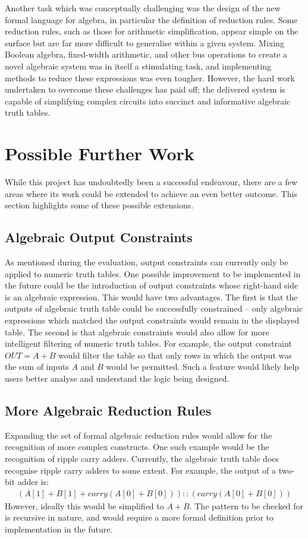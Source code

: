 Another task which was conceptually challenging was the design of the new formal language for algebra, in particular the definition of reduction rules. Some reduction rules, such as those for arithmetic simplification, appear simple on the surface but are far more difficult to generalise within a given system. Mixing Boolean algebra, fixed-width arithmetic, and other bus operations to create a novel algebraic system was in itself a stimulating task, and implementing methods to reduce these expressions was even tougher. However, the hard work undertaken to overcome these challenges has paid off; the delivered system is capable of simplifying complex circuits into succinct and informative algebraic truth tables.

\section{Possible Further Work}
While this project has undoubtedly been a successful endeavour, there are a few areas where its work could be extended to achieve an even better outcome. This section highlights some of these possible extensions.
\subsection{Algebraic Output Constraints} \label{subsec:algoutputcons}
As mentioned during the evaluation, output constraints can currently only be applied to numeric truth tables. One possible improvement to be implemented in the future could be the introduction of output constraints whose right-hand side is an algebraic expression. This would have two advantages. The first is that the outputs of algebraic truth table could be successfully constrained -- only algebraic expressions which matched the output constraints would remain in the displayed table. The second is that algebraic constraints would also allow for more intelligent filtering of numeric truth tables. For example, the output constraint $OUT = A + B$ would filter the table so that only rows in which the output was the sum of inputs $A$ and $B$ would be permitted. Such a feature would likely help users better analyse and understand the logic being designed.
\subsection{More Algebraic Reduction Rules}
Expanding the set of formal algebraic reduction rules would allow for the recognition of more complex constructs. One such example would be the recognition of ripple carry adders. Currently, the algebraic truth table does recognise ripple carry adders to some extent. For example, the output of a two-bit adder is:
\begin{align*}
    (A[1] + B[1] + carry(A[0] + B[0]))::(carry(A[0] + B[0]))
\end{align*}
However, ideally this would be simplified to $A + B$. The pattern to be checked for is recursive in nature, and would require a more formal definition prior to implementation in the future.
